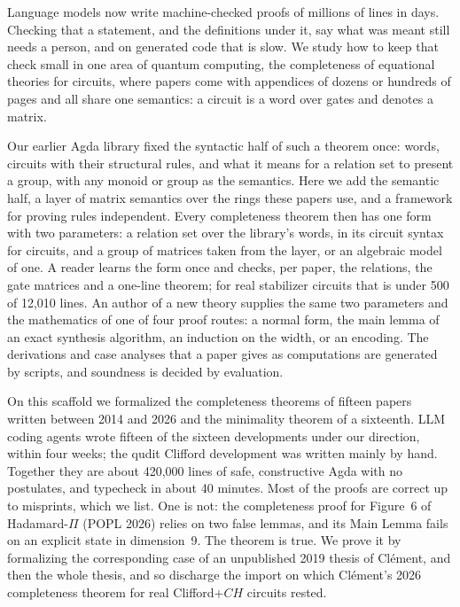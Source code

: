Language models now write machine-checked proofs of millions of lines
in days. Checking that a statement, and the definitions under it, say
what was meant still needs a person, and on generated code that is
slow. We study how to keep that check small in one area of quantum
computing, the completeness of equational theories for circuits, where
papers come with appendices of dozens or hundreds of pages and all
share one semantics: a circuit is a word over gates and denotes a
matrix.

Our earlier Agda library fixed the syntactic half of such a theorem
once: words, circuits with their structural rules, and what it means
for a relation set to present a group, with any monoid or group as the
semantics. Here we add the semantic half, a layer of matrix semantics
over the rings these papers use, and a framework for proving rules
independent. Every completeness theorem then has one form with two
parameters: a relation set over the library's words, in its circuit
syntax for circuits, and a group of matrices taken from the layer, or
an algebraic model of one. A reader learns the form once and checks,
per paper, the relations, the gate matrices and a one-line theorem; for
real stabilizer circuits that is under 500 of 12{,}010 lines. An author
of a new theory supplies the same two parameters and the mathematics of
one of four proof routes: a normal form, the main lemma of an exact
synthesis algorithm, an induction on the width, or an encoding. The
derivations and case analyses that a paper gives as computations are
generated by scripts, and soundness is decided by evaluation.

On this scaffold we formalized the completeness theorems of fifteen
papers written between 2014 and 2026 and the minimality theorem of a
sixteenth. LLM coding agents wrote fifteen of the sixteen developments
under our direction, within four weeks; the qudit Clifford development
was written mainly by hand. Together they are about 420{,}000 lines of
safe, constructive Agda with no postulates, and typecheck in about 40
minutes. Most of the proofs are correct up to misprints, which we list.
One is not: the
completeness proof for Figure~6 of Hadamard-$\Pi$ (POPL 2026) relies on
two false lemmas, and its Main Lemma fails on an explicit state in
dimension~9. The theorem is true. We prove it by formalizing the
corresponding case of an unpublished 2019 thesis of Cl\'ement, and then
the whole thesis, and so discharge the import on which Cl\'ement's 2026
completeness theorem for real Clifford+$CH$ circuits rested.
